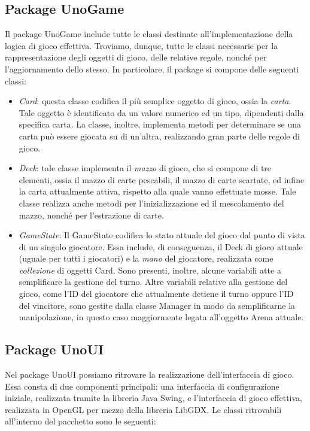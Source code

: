 \documentclass[11pt]{article} %
\begin{document}
\subsection{Package UnoGame}
Il package UnoGame include tutte le classi destinate all'implementazione della logica di gioco effettiva. Troviamo, dunque, tutte le classi necessarie per la rappresentazione degli oggetti di gioco, delle relative regole, nonché per l'aggiornamento dello stesso. In particolare, il package si compone delle seguenti classi:

\begin{itemize}
	\item \emph{Card}: questa classe codifica il più semplice oggetto di gioco, ossia la \textit{carta}. Tale oggetto è identificato da un valore numerico ed un tipo, dipendenti dalla specifica carta. La classe, inoltre, implementa metodi per determinare se una carta può essere giocata su di un'altra, realizzando gran parte delle regole di gioco.
	\item \emph{Deck}: tale classe implementa il \textit{mazzo} di gioco, che si compone di tre elementi, ossia il mazzo di carte pescabili, il mazzo di carte scartate, ed infine la carta attualmente attiva, rispetto alla quale vanno effettuate mosse. Tale classe realizza anche metodi per l'inizializzazione ed il mescolamento del mazzo, nonché per l'estrazione di carte. 
	\item \emph{GameState}: Il GameState codifica lo stato attuale del gioco dal punto di vista di un singolo giocatore. Essa include, di conseguenza, il Deck di gioco attuale (uguale per tutti i giocatori) e la \textit{mano} del giocatore, realizzata come \textit{collezione} di oggetti Card. Sono presenti, inoltre, alcune variabili atte a semplificare la gestione del turno. Altre variabili relative alla gestione del gioco, come l'ID del giocatore che attualmente detiene il turno oppure l'ID del vincitore, sono gestite dalla classe Manager in modo da semplificarne la manipolazione, in questo caso maggiormente legata all'oggetto Arena attuale.
\end{itemize} 

\subsection{Package UnoUI}
Nel package UnoUI possiamo ritrovare la realizzazione dell'interfaccia di gioco. Essa consta di due componenti principali: una interfaccia di configurazione iniziale, realizzata tramite la libreria Java Swing, e l'interfaccia di gioco effettiva, realizzata in OpenGL per mezzo della libreria LibGDX. Le classi ritrovabili all'interno del pacchetto sono le seguenti:
\end{document}
